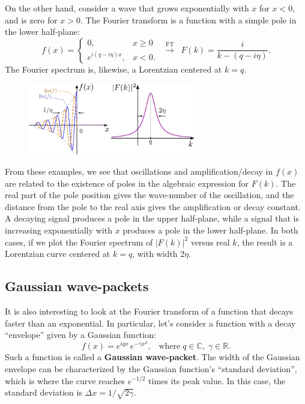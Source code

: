 \documentclass[10pt,a4paper]{article}
\begin{document}
On the other hand, consider a wave that grows exponentially with $x$
for $x < 0$, and is zero for $x > 0$. The Fourier transform is a
function with a simple pole in the lower half-plane:
\begin{equation}
  f(x) = \left\{\begin{array}{cl}0, & x \ge 0 \\
  e^{i (q - i\eta) x}, & x < 0.\end{array}\right. \;\;
  \overset{\mathrm{FT}}{\longrightarrow} \;\; F(k) = \frac{i}{k-(q - i\eta)}.
\end{equation}
The Fourier spectrum is, likewise, a Lorentzian centered at $k = q$.

\begin{figure}[h]
  \centering\includegraphics[width=0.65\textwidth]{fourier_example3}
\end{figure}

From these examples, we see that oscillations and amplification/decay
in $f(x)$ are related to the existence of poles in the algebraic
expression for $F(k)$. The real part of the pole position gives the
wave-number of the oscillation, and the distance from the pole to the
real axis gives the amplification or decay constant. A decaying signal
produces a pole in the upper half-plane, while a signal that is
increasing exponentially with $x$ produces a pole in the lower
half-plane. In both cases, if we plot the Fourier spectrum of
$|F(k)|^2$ versus real $k$, the result is a Lorentzian curve centered
at $k = q$, with width $2\eta$.

\subsection{Gaussian wave-packets}\label{gaussian-wave-packets}

It is also interesting to look at the Fourier transform of a function
that decays faster than an exponential. In particular, let's consider
a function with a decay ``envelope'' given by a Gaussian function:
\begin{equation}
  f(x) = e^{iq x} \, e^{-\gamma x^2}, \;\;\;\mathrm{where}\;
  q \in \mathbb{C},\; \gamma \in \mathbb{R}.
\end{equation}
Such a function is called a \textbf{Gaussian wave-packet}. The width
of the Gaussian envelope can be characterized by the Gaussian
function's ``standard deviation'', which is where the curve reaches
$e^{-1/2}$ times its peak value.  In this case, the standard deviation
is $\Delta x = 1/\sqrt{2\gamma}$.
\end{document}
